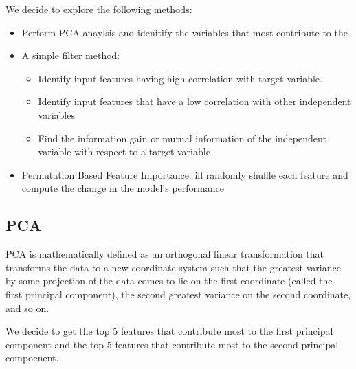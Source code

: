 \documentclass[letterpaper,10pt,english]{jupyterBook}
\begin{document}
\sphinxAtStartPar
We decide to explore the following methods:
\begin{itemize}
\item {} 
\sphinxAtStartPar
Perform PCA anaylsis and idenitify the variables that most contribute to the

\item {} 
\sphinxAtStartPar
A simple filter method:
\begin{itemize}
\item {} 
\sphinxAtStartPar
Identify input features having high correlation with target variable.

\item {} 
\sphinxAtStartPar
Identify input features that have a low correlation with other independent variables

\item {} 
\sphinxAtStartPar
Find the information gain or mutual information of the independent variable with respect to a target variable

\end{itemize}

\item {} 
\sphinxAtStartPar
Permutation Based Feature Importance: ill randomly shuffle each feature and compute the change in the model’s performance

\end{itemize}


\subsection{PCA}
\label{\detokenize{Model_evaluation:pca}}
\sphinxAtStartPar
PCA is mathematically defined as an orthogonal linear transformation that transforms the data to a new coordinate system such that the greatest variance by some projection of the data comes to lie on the first coordinate (called the first principal component), the second greatest variance on the second coordinate, and so on.

\sphinxAtStartPar
We decide to get the top 5 features that contribute most to the first principal component and the top 5 features that contribute most to the second principal compoenent.
\end{document}
